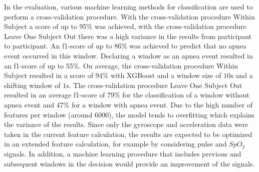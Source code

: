 In the evaluation, various machine learning methods for classification are used to perform a cross-validation procedure. 
With the cross-validation procedure {\glqq Within Subject\grqq} a score of up to 95\% was achieved, with the cross-validation procedure {\glqq Leave One Subject Out\grqq} there was a high variance in the results from participant to participant. 
An f1-score of up to 86\% was achieved to predict that no apnea event occurred in this window. 
Declaring a window as an apnea event resulted in an f1-score of up to 55\%.
On average, the cross-validation procedure {\glqq Within Subject\grqq} resulted in a score of 94\% with XGBoost and a window size of $10\si{\s}$ and a shifting window of $1\si{\s}$. 
The cross-validation procedure {\glqq Leave One Subject Out\grqq} resulted in an average f1-score of 79\% for the classification of a window without apnea event and 47\% for a window with apnea event. 
Due to the high number of features per window (around 6000), the model tends to overfitting which explains the variance of the results.
Since only the gyroscope and acceleration data were taken in the current feature calculation, the results are expected to be optimized in an extended feature calculation, for example by considering pulse and $SpO_2$ signals. 
In addition, a machine learning procedure that includes previous and subsequent windows in the decision would provide an improvement of the signals.

\cleardoublepage